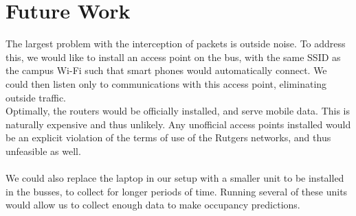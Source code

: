 \documentclass[letterpaper]{scrartcl}
\begin{document}
\section*{Future Work}
The largest problem with the interception of packets is outside noise.
To address this, we would like to install an access point on the bus, with the same SSID as the campus Wi-Fi such that smart phones would automatically connect.
We could then listen only to communications with this access point, eliminating outside traffic.
\\
Optimally, the routers would be officially installed, and serve mobile data. This is naturally expensive and thus unlikely. Any unofficial access points installed would be an explicit violation of the terms of use of the Rutgers networks, and thus unfeasible as well.
\\
\\
We could also replace the laptop in our setup with a smaller unit to be installed in the busses, to collect for longer periods of time. Running several of these units would allow us to collect enough data to make occupancy predictions.
\end{document}
